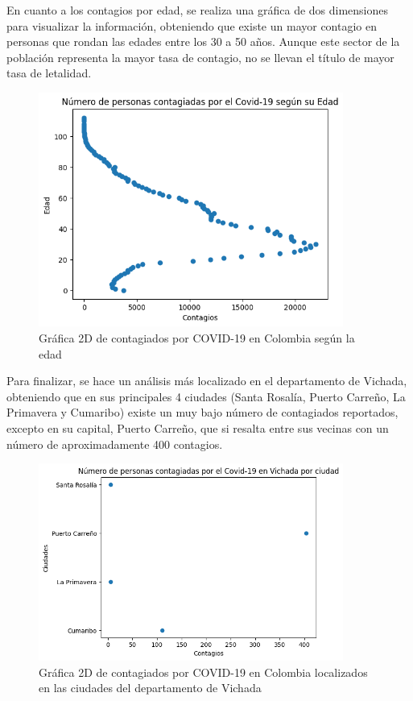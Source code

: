 \documentclass[conference,compsoc,onecolumn]{IEEEtran}
\begin{document}
En cuanto a los contagios por edad, se realiza una gráfica de dos dimensiones para visualizar la información, obteniendo que existe un mayor contagio en personas que rondan las edades entre los 30 a 50 años. Aunque este sector de la población representa la mayor tasa de contagio, no se llevan el título de mayor tasa de letalidad.

\begin{figure}[H]
\centering
\includegraphics[width=10cm]{./images/Grafico2d_Edad.png}
\caption{Gráfica 2D de contagiados por COVID-19 en Colombia según la edad}
\label{fig:mesh1}
\end{figure}

Para finalizar, se hace un análisis más localizado en el departamento de Vichada, obteniendo que en sus principales 4 ciudades (Santa Rosalía, Puerto Carreño, La Primavera y Cumaribo) existe un muy bajo número de contagiados reportados, excepto en su capital, Puerto Carreño, que si resalta entre sus vecinas con un número de aproximadamente 400 contagios.  

\begin{figure}[H]
\centering
\includegraphics[width=10cm]{./images/Grafico2d_Vichada.png}
\caption{Gráfica 2D de contagiados por COVID-19 en Colombia localizados en las ciudades del departamento de Vichada}
\label{fig:mesh1}
\end{figure}
\end{document}
